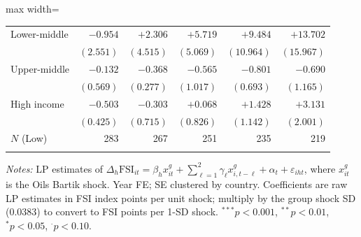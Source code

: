 \begin{table}[htbp]
\begin{adjustbox}{max width=\textwidth}
\begin{threeparttable}
\begin{tabular}{l rrrrr}
Lower-middle & $-0.954$ & $+2.306$ & $+5.719$ & $+9.484$ & $+13.702$ \\
& $(2.551)$ & $(4.515)$ & $(5.069)$ & $(10.964)$ & $(15.967)$ \\[3pt]
Upper-middle & $-0.132$ & $-0.368$ & $-0.565$ & $-0.801$ & $-0.690$ \\
& $(0.569)$ & $(0.277)$ & $(1.017)$ & $(0.693)$ & $(1.165)$ \\[3pt]
High income & $-0.503$ & $-0.303$ & $+0.068$ & $+1.428$ & $+3.131$ \\
& $(0.425)$ & $(0.715)$ & $(0.826)$ & $(1.142)$ & $(2.001)$ \\[3pt]
\midrule
$N$ (Low) & 283 & 267 & 251 & 235 & 219 \\
\addlinespace
\bottomrule
\end{tabular}
\begin{tablenotes}\small
\item \textit{Notes:} LP estimates of $\Delta_h\text{FSI}_{it} = \beta_h x^g_{it} + \sum_{\ell=1}^{2}\gamma_\ell x^g_{i,t-\ell} + \alpha_t + \varepsilon_{iht}$, where $x^g_{it}$ is the Oils Bartik shock. Year FE; SE clustered by country. Coefficients are raw LP estimates in FSI index points per unit shock; multiply by the group shock SD ($0.0383$) to convert to FSI points per 1-SD shock. $^{***}p<0.001$, $^{**}p<0.01$, $^{*}p<0.05$, $^{\cdot}p<0.10$.
\end{tablenotes}
\end{threeparttable}
\end{adjustbox}
\end{table}
